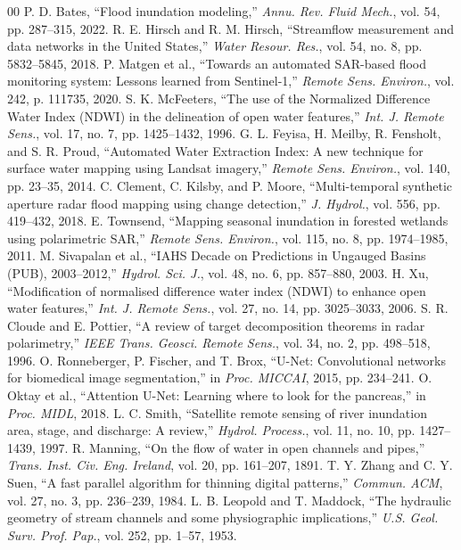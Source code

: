 \documentclass[conference]{IEEEtran}
\begin{document}
\begin{thebibliography}{00}
 P. D. Bates, ``Flood inundation modeling,'' \textit{Annu. Rev. Fluid Mech.}, vol. 54, pp. 287--315, 2022.
 R. E. Hirsch and R. M. Hirsch, ``Streamflow measurement and data networks in the United States,'' \textit{Water Resour. Res.}, vol. 54, no. 8, pp. 5832--5845, 2018.
 P. Matgen et al., ``Towards an automated SAR-based flood monitoring system: Lessons learned from Sentinel-1,'' \textit{Remote Sens. Environ.}, vol. 242, p. 111735, 2020.
 S. K. McFeeters, ``The use of the Normalized Difference Water Index (NDWI) in the delineation of open water features,'' \textit{Int. J. Remote Sens.}, vol. 17, no. 7, pp. 1425--1432, 1996.
 G. L. Feyisa, H. Meilby, R. Fensholt, and S. R. Proud, ``Automated Water Extraction Index: A new technique for surface water mapping using Landsat imagery,'' \textit{Remote Sens. Environ.}, vol. 140, pp. 23--35, 2014.
 C. Clement, C. Kilsby, and P. Moore, ``Multi-temporal synthetic aperture radar flood mapping using change detection,'' \textit{J. Hydrol.}, vol. 556, pp. 419--432, 2018.
 E. Townsend, ``Mapping seasonal inundation in forested wetlands using polarimetric SAR,'' \textit{Remote Sens. Environ.}, vol. 115, no. 8, pp. 1974--1985, 2011.
 M. Sivapalan et al., ``IAHS Decade on Predictions in Ungauged Basins (PUB), 2003--2012,'' \textit{Hydrol. Sci. J.}, vol. 48, no. 6, pp. 857--880, 2003.
 H. Xu, ``Modification of normalised difference water index (NDWI) to enhance open water features,'' \textit{Int. J. Remote Sens.}, vol. 27, no. 14, pp. 3025--3033, 2006.
 S. R. Cloude and E. Pottier, ``A review of target decomposition theorems in radar polarimetry,'' \textit{IEEE Trans. Geosci. Remote Sens.}, vol. 34, no. 2, pp. 498--518, 1996.
 O. Ronneberger, P. Fischer, and T. Brox, ``U-Net: Convolutional networks for biomedical image segmentation,'' in \textit{Proc. MICCAI}, 2015, pp. 234--241.
 O. Oktay et al., ``Attention U-Net: Learning where to look for the pancreas,'' in \textit{Proc. MIDL}, 2018.
 L. C. Smith, ``Satellite remote sensing of river inundation area, stage, and discharge: A review,'' \textit{Hydrol. Process.}, vol. 11, no. 10, pp. 1427--1439, 1997.
 R. Manning, ``On the flow of water in open channels and pipes,'' \textit{Trans. Inst. Civ. Eng. Ireland}, vol. 20, pp. 161--207, 1891.
 T. Y. Zhang and C. Y. Suen, ``A fast parallel algorithm for thinning digital patterns,'' \textit{Commun. ACM}, vol. 27, no. 3, pp. 236--239, 1984.
 L. B. Leopold and T. Maddock, ``The hydraulic geometry of stream channels and some physiographic implications,'' \textit{U.S. Geol. Surv. Prof. Pap.}, vol. 252, pp. 1--57, 1953.
\end{thebibliography}
\end{document}
